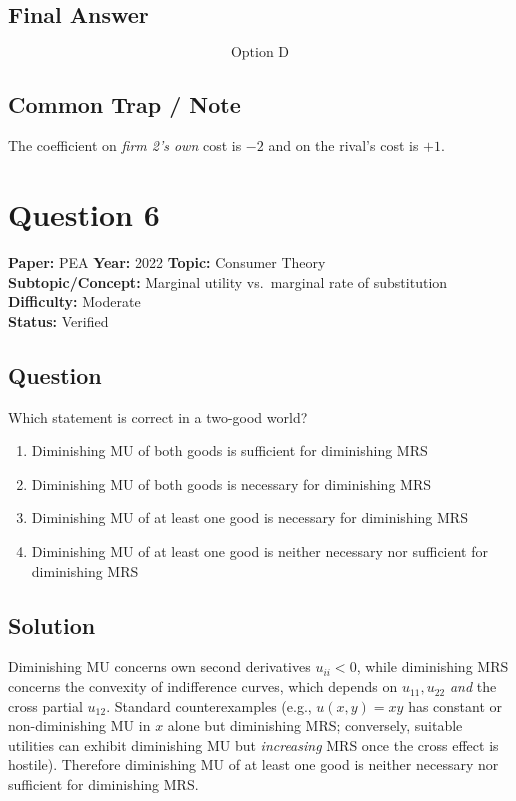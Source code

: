 \documentclass[11pt]{article}
\begin{document}
\subsection*{Final Answer}
\[
\boxed{\text{Option D}}
\]

\subsection*{Common Trap / Note}
The coefficient on \emph{firm 2's own} cost is $-2$ and on the rival's cost is $+1$.

\section*{Question 6}
\textbf{Paper:} PEA \quad \textbf{Year:} 2022 \quad \textbf{Topic:} Consumer Theory \\
\textbf{Subtopic/Concept:} Marginal utility vs.\ marginal rate of substitution \quad \textbf{Difficulty:} Moderate \\
\textbf{Status:} Verified

\subsection*{Question}
Which statement is correct in a two-good world?
\begin{enumerate}[label=(\Alph*)]
\item Diminishing MU of both goods is sufficient for diminishing MRS
\item Diminishing MU of both goods is necessary for diminishing MRS
\item Diminishing MU of at least one good is necessary for diminishing MRS
\item Diminishing MU of at least one good is neither necessary nor sufficient for diminishing MRS
\end{enumerate}

\subsection*{Solution}
Diminishing MU concerns own second derivatives $u_{ii} < 0$, while diminishing MRS concerns
the convexity of indifference curves, which depends on $u_{11}, u_{22}$ \emph{and} the cross
partial $u_{12}$. Standard counterexamples (e.g., $u(x,y) = xy$ has constant or non-diminishing
MU in $x$ alone but diminishing MRS; conversely, suitable utilities can exhibit diminishing
MU but \emph{increasing} MRS once the cross effect is hostile). Therefore diminishing MU of
at least one good is neither necessary nor sufficient for diminishing MRS.
\end{document}
